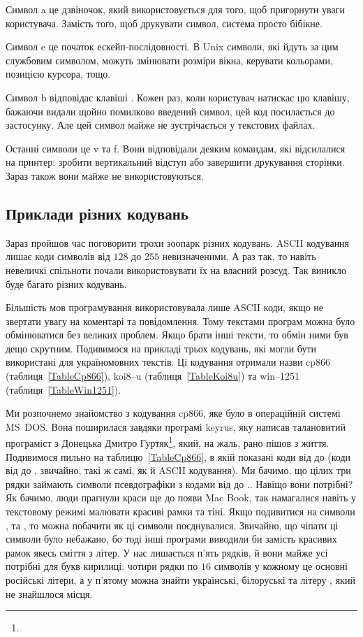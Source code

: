 Символ \chesc a це дзвіночок, який використовується для того, щоб пригорнути уваги користувача.
Замість того, щоб друкувати символ, система просто бібікне.

Символ \chesc e це початок ескейп-послідовності.
В Unix символи, які йдуть за цим службовим символом, можуть змінювати розміри вікна, керувати кольорами, позицією курсора, тощо.

Символ \chesc b відповідає клавіші \keys{\backspace}.
Кожен раз, коли користувач натискає цю клавішу, бажаючи видали щойно помилково введений символ, цей код посилається до застосунку.
Але цей символ майже не зустрічається у текстових файлах.

Останні символи це \chesc v та \chesc f.
Вони відповідали деяким командам, які відсилалися на принтер: зробити вертикальний відступ або завершити друкування сторінки.
Зараз також вони майже не використовуються.

\subsection{Приклади різних кодувань}

Зараз пройшов час поговорити трохи зоопарк різних кодувань.
ASCII кодування лишає коди символів від $128$ до $255$ невизначеними.
А раз так, то навіть невеличкі спільноти почали використовувати їх на власний розсуд.
Так виникло буде багато різних кодувань.

Більшість мов програмування використовувала лише ASCII коди, якщо не звертати увагу на коментарі та повідомлення.
Тому текстами програм можна було обмінюватися без великих проблем.
Якщо брати інші тексти, то обмін ними був дещо скрутним.
Подивимося на прикладі трьох кодувань,  які могли бути використані для україномовних текстів.
Ці кодування отримали назви cp866 (таблиця~\ref{TableCp866}), koi8--u (таблиця~\ref{TableKoi8u}) та win--1251 (таблиця~\ref{TableWin1251}).

Ми розпочнемо знайомство з кодування cp866, яке було в операційній системі MS~DOS.
Вона поширилася завдяки програмі keyrus, яку написав талановитий програміст з Донецька Дмитро Гуртяк\footnote{\Gurtyak}, який, на жаль, рано пішов з життя.
Подивимося пильно на таблицю~\ref{TableCp866}, в якій показані коди від  до  (коди від  до , звичайно, такі ж самі, як й ASCII кодування).
Ми бачимо, що цілих три рядки займають символи псевдографіки з кодами від  до ..
Навіщо вони потрібні?
Як бачимо, люди прагнули краси ще до появи Mac Book, так намагалися навіть у текстовому режимі малювати красиві рамки та тіні.
Якщо подивитися на символи ,  та , то можна побачити як ці символи поєднувалися.
Звичайно, що чіпати ці символи було небажано, бо тоді інші програми виводили би замість красивих рамок якесь сміття з літер.
У нас лишається п'ять рядків, й вони майже усі потрібні для букв кирилиці: чотири рядки по $16$ символів у кожному це основні російські літери, а у п'ятому можна знайти українські, білоруські та літеру , який не знайшлося місця.

